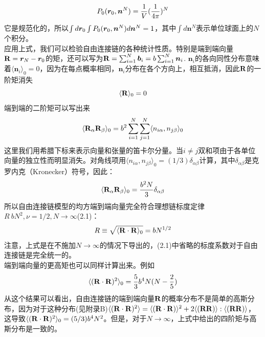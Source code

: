 \begin{equation}
P_0(\bm{r}_0,\bm{n}^{N})=\frac{1}{V} (\frac{1}{4 \pi})^{N}
\label{2.8}
\end{equation}
它是规范化的，所以$\int d\bm{r}_0\int P_0(\bm{r}_0,\bm{n}^{N})d\bm{n}^{N}=1$，其中$\int d\bm{n}^{N}$表示单位球面上的$N$个积分。\\
应用上式，我们可以检验自由连接链的各种统计性质。特别是端到端向量$\mathbf{R}=\bm{r}_{N}-\bm{r}_0$的矩，还可以写为$\mathbf{R}=\sum _{i=1}^{N} \bm{b}_{i}=b \sum _{i=1}^{N} \bm{n}_{i}$.
$\bm{n}_{i}$的各向同性分布意味着$\langle \bm{n}_{i}\rangle _{0}=0$，因为在每点概率相同，$\bm{n}_{i}$分布在各个方向上，相互抵消，因此$\mathbf{R}$的一阶矩消失\\
\begin{equation}
\langle \mathbf{R} \rangle_{0}=0
\label{2.9}
\end{equation}
端到端的二阶矩可以写出来\\
\begin{equation}
\langle \mathbf{R}_{\alpha} \mathbf{R}_{\beta}\rangle_{0}=b^2 \sum _{i=1}^{N} \sum _{j=1}^{N} \langle n_{i \alpha},n_{j \beta} \rangle_{0}
\label{2.10}
\end{equation}
这里我们用希腊下标来表示向量和张量的笛卡尔分量。当$i\neq j$双和项由于各单位向量的独立性而明显消失。对角线项用$\langle n_{i \alpha},n_{j \beta} \rangle_{0}=(1/3)\delta_{\alpha  \beta }$计算，其中$\delta_{\alpha \beta }$是克罗内克（Kronecker）符号，因此：\\
\begin{equation}
\langle \mathbf{R}_{\alpha} \mathbf{R}_{\beta}\rangle_{0}=\frac{b^{2}N}{3}\delta_{\alpha \beta }
\label{2.11}
\end{equation}
所以自由连接链模型的均方端到端向量完全符合理想链标度定律$R~bN^2,\nu=1/2,N \rightarrow \infty $(2.1)：\\
\begin{equation}
R\equiv \sqrt{\langle \mathbf{R} \cdot \mathbf{R}\rangle _{0}}=bN^{1/2}
\label{2.12}
\end{equation}
注意，上式是在不施加$N\rightarrow \infty$的情况下导出的，(2.1)中省略的标度系数对于自由连接链是完全统一的。\\

端到端向量的更高矩也可以同样计算出来。例如\\
\begin{equation}
\langle (\mathbf{R} \cdot \mathbf{R})^2 \rangle_{0}=\frac{5}{3}b^4N(N-\frac{2}{5})
\label{2.13}
\end{equation}
从这个结果可以看出，自由连接链的端到端向量$\mathbf{R}$的概率分布不是简单的高斯分布，因为对于这种分布(见附录B)$\langle (\mathbf{R} \cdot \mathbf{R})^2 \rangle=\langle (\mathbf{R} \cdot \mathbf{R}) \rangle^2+2\langle (\mathbf{R} \mathbf{R})\rangle:\langle (\mathbf{R} \mathbf{R})\rangle$，这导致$\langle (\mathbf{R} \cdot \mathbf{R})^2 \rangle_{0}=(5/3)b^4N^2$。但是，对于$N\rightarrow \infty$，上式中给出的四阶矩与高斯分布是一致的。\\

